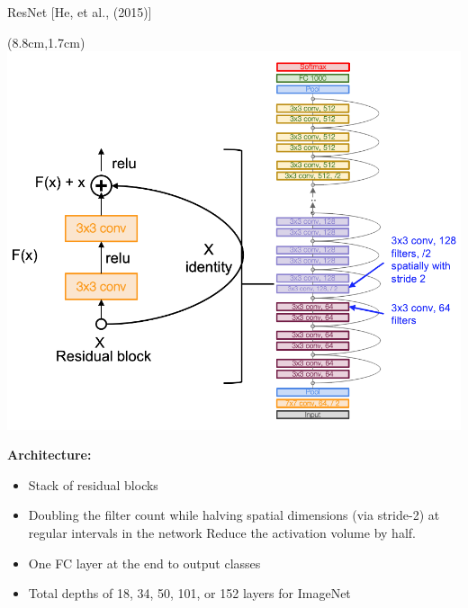\documentclass[serif, aspectratio=169]{beamer}
\begin{document}
\begin{frame}{ResNet [He, et al., (2015)]}
	\begin{textblock*}{5cm}(8.8cm,1.7cm) %
		\includegraphics[keepaspectratio, scale=0.22]{pic/res_arch}
	\end{textblock*}
	\textbf{Architecture:}
	\begin{itemize}
		\item Stack of residual blocks
		\item Doubling the filter count while halving \newline spatial dimensions (via stride-2) at regular \newline intervals in the network Reduce the \newline activation volume by half.
		

		\item One FC layer at the end to output classes
		\item Total depths of 18, 34, 50, 101, or 152 \newline layers for ImageNet
	\end{itemize}
\end{frame}
\end{document}
